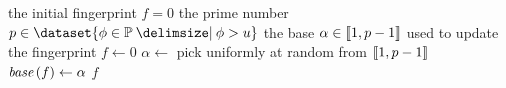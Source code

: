 \begin{algorithmic}[1]
  \Out the initial fingerprint \( f = 0 \)
  \Constant the prime number \( p \in \dataset{\phi \in \primes \suchthat \phi > u} \)
  \Local the base \( \alpha \in \llbracket1, p - 1\rrbracket \) used to update the fingerprint
    \State \( f \gets 0 \)
    \State \( \alpha \gets \) pick uniformly at random from \( \llbracket1, p - 1\rrbracket \)
    \State \( \base (f) \gets \alpha \)
    \State \Return \( f \)
  \EndFunction
\end{algorithmic}
